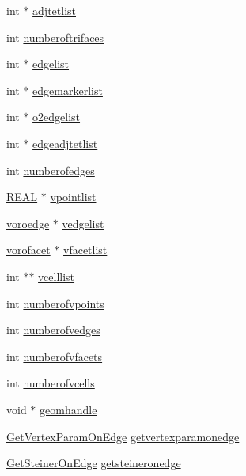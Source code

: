 \begin{DoxyCompactItemize}
int $\ast$ \hyperlink{classtetgenio_a44f7eb61256dfb95d2fa2bdb91ea3718}{adjtetlist}
\item 
int \hyperlink{classtetgenio_aba0186083c61eb48fca7e80b4a3158f2}{numberoftrifaces}
\item 
int $\ast$ \hyperlink{classtetgenio_ad4910159c1aa4dad3e66b24d8816f76c}{edgelist}
\item 
int $\ast$ \hyperlink{classtetgenio_a35d12dcf3f3bb8e9304617da0e36d13f}{edgemarkerlist}
\item 
int $\ast$ \hyperlink{classtetgenio_a0bf45168ac1af3d5b5ccaf8fe4cb13e3}{o2edgelist}
\item 
int $\ast$ \hyperlink{classtetgenio_ac1b0d2422e6da1fb08246f61e39bb352}{edgeadjtetlist}
\item 
int \hyperlink{classtetgenio_a5f2c3193ef485cbbf53416538c9df73c}{numberofedges}
\item 
\hyperlink{tetgen_8h_a4b654506f18b8bfd61ad2a29a7e38c25}{R\-E\-A\-L} $\ast$ \hyperlink{classtetgenio_afecb51e1302b9006eba50bc2a995b372}{vpointlist}
\item 
\hyperlink{structtetgenio_1_1voroedge}{voroedge} $\ast$ \hyperlink{classtetgenio_ab9abf598dc77ffd6754cc087f32bcc98}{vedgelist}
\item 
\hyperlink{structtetgenio_1_1vorofacet}{vorofacet} $\ast$ \hyperlink{classtetgenio_a14c253eb433eecf874ab4b6fba68c683}{vfacetlist}
\item 
int $\ast$$\ast$ \hyperlink{classtetgenio_ac39235a7d29d7786e8471e9c3b88d292}{vcelllist}
\item 
int \hyperlink{classtetgenio_a418782ab7caedfd9c316905996400553}{numberofvpoints}
\item 
int \hyperlink{classtetgenio_a4c8ba7851351b7f70e3ef837e2900f74}{numberofvedges}
\item 
int \hyperlink{classtetgenio_a054e5d022a3e6c6cb490975487390bba}{numberofvfacets}
\item 
int \hyperlink{classtetgenio_afbc917d5c352817d0668170f71bb8404}{numberofvcells}
\item 
void $\ast$ \hyperlink{classtetgenio_a7d3bb20b8973217ce08614dabb3b7d2a}{geomhandle}
\item 
\hyperlink{classtetgenio_a57d18c4c976af43f3e9743a11f78f1f7}{Get\-Vertex\-Param\-On\-Edge} \hyperlink{classtetgenio_a7278480edf09861f713ad92e589221f2}{getvertexparamonedge}
\item 
\hyperlink{classtetgenio_ab5ba46cbbf0dd7ebc4875fa70b7f1c65}{Get\-Steiner\-On\-Edge} \hyperlink{classtetgenio_a08ab06b4e0af5a4911a0d5ae04fe08e3}{getsteineronedge}
$$
\end{DoxyCompactItemize}
